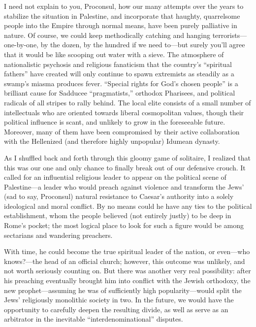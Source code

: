 I need not explain to you, Proconsul, how our many attempts over the years to stabilize the situation in Palestine, and incorporate that haughty, quarrelsome people into the Empire through normal means, have been purely palliative in nature. Of course, we could keep methodically catching and hanging terrorists---one-by-one, by the dozen, by the hundred if we need to---but surely you'll agree that it would be like scooping out water with a sieve. The atmosphere of nationalistic psychosis and religious fanaticism that the country's ``spiritual fathers'' have created will only continue to spawn extremists as steadily as a swamp's miasma produces fever. ``Special rights for God's chosen people'' is a brilliant cause for Sadducee ``pragmatists,'' orthodox Pharisees, and political radicals of all stripes to rally behind. The local elite consists of a small number of intellectuals who are oriented towards liberal cosmopolitan values, though their political influence is scant, and unlikely to grow in the foreseeable future. Moreover, many of them have been compromised by their active collaboration with the Hellenized (and therefore highly unpopular) Idumean dynasty.

As I shuffled back and forth through this gloomy game of solitaire, I realized that this was our one and only chance to finally break out of our defensive crouch. It called for an influential religious leader to appear on the political scene of Palestine---a leader who would preach against violence and transform the Jews' (sad to say, Proconsul) natural resistance to Caesar's authority into a solely ideological and moral conflict. By no means could he have any ties to the political establishment, whom the people believed (not entirely justly) to be deep in Rome's pocket; the most logical place to look for such a figure would be among sectarians and wandering preachers.

With time, he could become the true spiritual leader of the nation, or even---who knows?---the head of an official church; however, this outcome was unlikely, and not worth seriously counting on. But there was another very real possibility: after his preaching eventually brought him into conflict with the Jewish orthodoxy, the new prophet---assuming he was of sufficiently high popularity---would split the Jews' religiously monolithic society in two. In the future, we would have the opportunity to carefully deepen the resulting divide, as well as serve as an arbitrator in the inevitable ``interdenominational'' disputes.

